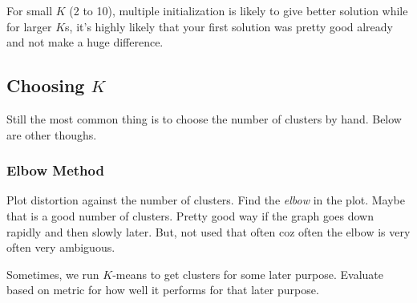 For small $K$ (2 to 10), multiple initialization is likely to give better solution
while for larger $K$s, it's highly likely that your first solution was pretty good
already and not make a huge difference.

\subsection{Choosing \texorpdfstring{$K$}{}}
Still the most common thing is to choose the number of clusters by hand.
Below are other thoughs.

\subsubsection{Elbow Method}
Plot distortion against the number of clusters. Find the \emph{elbow}
in the plot. Maybe that is a good number of clusters. Pretty good way
if the graph goes down rapidly and then slowly later. But, not used that
often coz often the elbow is very often very ambiguous.

Sometimes, we run $K$-means to get clusters for some later purpose. Evaluate
based on metric for how well it performs for that later purpose.

